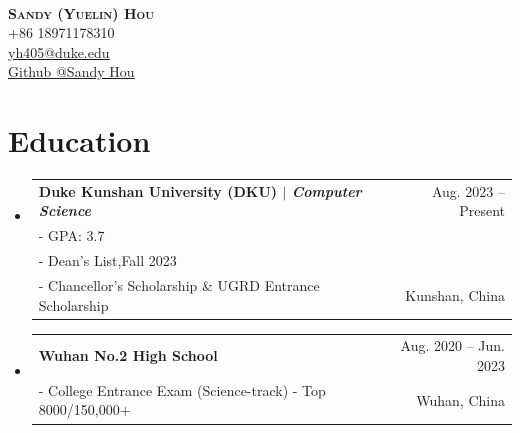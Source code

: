 \documentclass[letterpaper,11pt]{article}
\makeatletter
\newcommand{\CVSubheading}[4]{
  \vspace{-2pt}\item
    \begin{tabular*}{0.97\textwidth}[t]{l@{\extracolsep{\fill}}r}
      \textbf{#1} & #2 \\
      \small#3 & \small #4 \\
    \end{tabular*}\vspace{-7pt}
}
\newcommand{\CVSubHeadingListStart}{\begin{itemize}[leftmargin=0.5cm, label={}]}
\newcommand{\CVSubHeadingListEnd}{\end{itemize}}
\makeatother
\begin{document}

\begin{minipage}[c]{0.2\textwidth}
\end{minipage}
\begin{minipage}[c]{0.05\textwidth}
\-\
\end{minipage}
\begin{minipage}[c]{0.5\textwidth}
    \textbf{\Huge \scshape{Sandy (Yuelin) Hou}} \\ \vspace{1pt} 
    \small{+86 18971178310} \\
    \href{yh405@duke.edu}{\underline{yh405@duke.edu}}\\
    \href{https://github.com/Sandyuelin}{\underline{Github @Sandy Hou}}
\end{minipage}


\section{Education}
  \CVSubHeadingListStart
    \CVSubheading
      {{Duke Kunshan University (DKU) $ | $ \emph{\small{Computer Science}}}}{Aug. 2023 -- Present}
      {- GPA: 3.7 \\
      - Dean's List,Fall 2023 \\ 
      - Chancellor’s Scholarship \& UGRD Entrance Scholarship} {Kunshan, China}
    \CVSubheading
      {{Wuhan No.2 High School}}{Aug. 2020 -- Jun. 2023}
      {- College Entrance Exam (Science-track) - Top 8000/150,000+}{Wuhan, China}
  \CVSubHeadingListEnd
\end{document}
